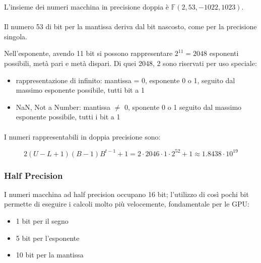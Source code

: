 \documentclass[a4paper, 11pt]{article}
\begin{document}
            L'insieme dei numeri macchina in precisione doppia è $\mathbb{F}(2, 53, -1022, 1023)$.

            \paragraph{}
            Il numero 53 di bit per la mantissa deriva dal bit nascosto, come per la precisione singola.

            Nell'esponente, avendo 11 bit si possono rappresentare $2^{11} = 2048$ esponenti possibili, metà pari e metà dispari.
            Di quei 2048, 2 sono riservati per uso speciale: 

            \begin{itemize}
                \item rappresentazione di infinito: mantissa = 0, esponente 0 o 1, seguito dal massimo esponente possibile, tutti bit a 1
                \item NaN, Not a Number: mantissa $\neq$ 0, sponente 0 o 1 seguito dal massimo esponente possibile, tutti i bit a 1
            \end{itemize}

            \paragraph{}
            I numeri rappresentabili in doppia precisione sono:



            \[
                2(U-L+1)(B-1)B^{t-1}+1 = 2\cdot 2046\cdot1\cdot2^{52}+1 \approx 1.8438\cdot 10^{19}
            \]



            \subsubsection{Half Precision}

            I numeri macchina ad half precision occupano 16 bit; l'utilizzo di così pochi bit permette di eseguire i calcoli molto più velocemente, fondamentale per le GPU:

            \begin{itemize}
                \item 1 bit per il segno 
                \item 5 bit per l'esponente
                \item 10 bit per la mantissa
            \end{itemize}
            
\end{document}
